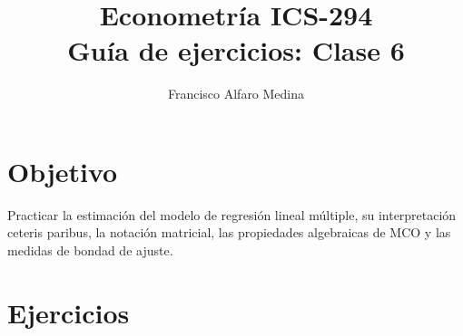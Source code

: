 \documentclass[11pt]{article}
\title{Econometría ICS-294\\Guía de ejercicios: Clase 6}
\author{Francisco Alfaro Medina}
\date{}
\begin{document}
\maketitle

\section*{Objetivo}

Practicar la estimación del modelo de regresión lineal múltiple, su interpretación ceteris paribus, la notación matricial, las propiedades algebraicas de MCO y las medidas de bondad de ajuste.

\section*{Ejercicios}
\end{document}
